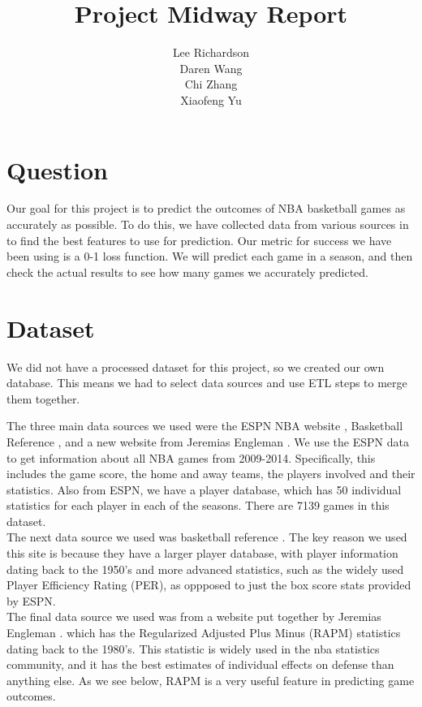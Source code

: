 \documentclass{article}
\title{Project Midway Report}
\author{Lee Richardson\\
	Daren Wang \\
	Chi Zhang \\
	Xiaofeng Yu \\}
\begin{document}
\maketitle

\section*{Question}
	Our goal for this project is to predict the outcomes of NBA basketball games as accurately as possible. To do this, we have collected data from various sources in to find the best features to use for prediction. Our metric for success we have been using is a 0-1 loss function. We will predict each game in a season, and then check the actual results to see how many games we accurately predicted.

\section*{Dataset}
	
	We did not have a processed dataset for this project, so we created our own database. This means we had to select data sources and use ETL steps to merge them together. \\

	\par The three main data sources we used were the ESPN NBA website \cite{espn}, Basketball Reference \cite{bball_ref}, and a new website from Jeremias Engleman \cite{rpm_data}. We use the ESPN data to get information about all NBA games from 2009-2014. Specifically, this includes the game score, the home and away teams, the players involved and their statistics. Also from ESPN, we have a player database, which has 50 individual statistics for each player in each of the seasons. There are 7139 games in this dataset. \\

	The next data source we used was basketball reference \cite{bball_ref}. The key reason we used this site is because they have a larger player database, with player information dating back to the 1950's and more advanced statistics, such as the widely used Player Efficiency Rating (PER), as oppposed to just the box score stats provided by ESPN. \\

	The final data source we used was from a website put together by Jeremias Engleman \cite{rpm_data}. which has the Regularized Adjusted Plus Minus (RAPM) statistics dating back to the 1980's. This statistic is widely used in the nba statistics community, and it has the best estimates of individual effects on defense than anything else. As we see below, RAPM is a very useful feature in predicting game outcomes. \\
\end{document}

